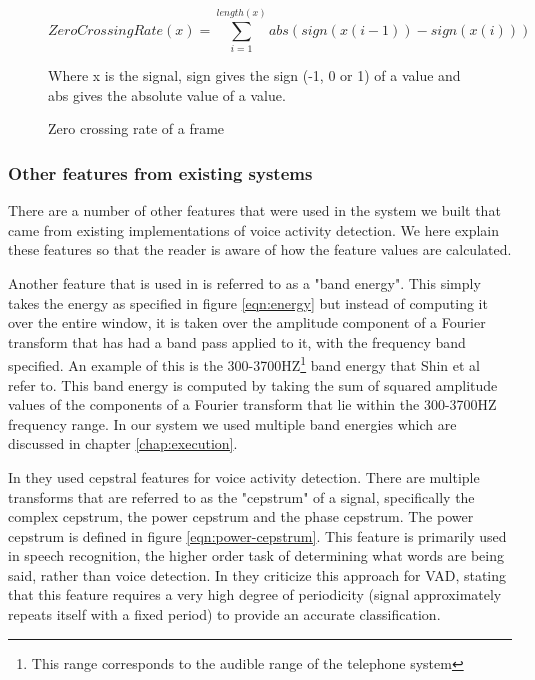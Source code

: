 \documentclass[ %
                    author={Sam Phippen},
                supervisor={Dr. Rafal Bogacz},
                     title={Real time voice activity detectors in noisy personal computing environments},
                  subtitle={},
                    degree={MEng},
                      year={2012} ]{thesis}
\begin{document}
\begin{figure}

    $$ZeroCrossingRate(x) =
    \sum_{i=1}^{length(x)}abs(sign(x(i-1))-sign(x(i)))$$


    Where x is the signal, sign gives the sign (-1, 0 or 1) of a value and
    abs gives the absolute value of a value.

    \caption{Zero crossing rate of a frame}
    \label{eqn:zero-crossing-rate}
\end{figure}

\subsubsection{Other features from existing systems}

There are a number of other features that were used in the system we built that
came from existing implementations of voice activity detection. We here explain
these features so that the reader is aware of how the feature values are
calculated.

Another feature that is used in \cite{shin} is referred to as a "band energy".
This simply takes the energy as specified in figure \ref{eqn:energy} but
instead of computing it over the entire window, it is taken over the amplitude
component of a Fourier transform that has had a band pass applied to it, with
the frequency band specified.  An example of this is the
300-3700HZ\footnote{This range corresponds to the audible range of the
telephone system} band energy that Shin et al refer to. This band energy is
computed by taking the sum of squared amplitude values of the components of a
Fourier transform that lie within the 300-3700HZ frequency range. In our system
we used multiple band energies which are discussed in chapter
\ref{chap:execution}.

In \cite{haigh} they used cepstral features for voice activity detection. There
are multiple transforms that are referred to as the "cepstrum" of a signal,
specifically the complex cepstrum, the power cepstrum and the phase
cepstrum\cite{childers}. The power cepstrum is defined in figure
\ref{eqn:power-cepstrum}. This feature is primarily used in speech recognition,
the higher order task of determining what words are being said, rather than
voice detection\cite{muda}. In \cite{atal} they criticize this approach for
VAD, stating that this feature requires a very high degree of periodicity
(signal approximately repeats itself with a fixed period) to provide an
accurate classification.
\end{document}
